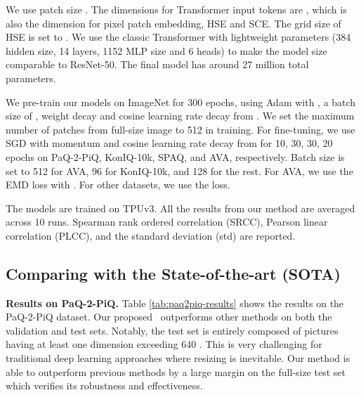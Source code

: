We use patch size . The dimensions for Transformer input tokens are , which is also the dimension for pixel patch embedding, HSE and SCE. The grid size of HSE is set to . We use the classic Transformer \cite{NIPS2017_3f5ee243} with lightweight parameters (384 hidden size, 14 layers, 1152 MLP size and 6 heads) to make the model size comparable to ResNet-50. The final model has around 27 million total parameters.

We pre-train our models on ImageNet for 300 epochs, using Adam with , a batch size of ,  weight decay and cosine learning rate decay from . We set the maximum number of patches from full-size image  to 512 in training. For fine-tuning, we use SGD with momentum and cosine learning rate decay from  for 10, 30, 30, 20 epochs on PaQ-2-PiQ, KonIQ-10k, SPAQ, and AVA, respectively. Batch size is set to 512 for AVA, 96 for KonIQ-10k, and 128 for the rest. For AVA, we use the EMD loss with . For other datasets, we use the  loss.

The models are trained on TPUv3. All the results from our method are averaged across 10 runs. Spearman rank ordered correlation (SRCC), Pearson linear correlation (PLCC), and the standard deviation (std) are reported.

\subsection{Comparing with the State-of-the-art (SOTA)}
\noindent\textbf{Results on PaQ-2-PiQ.} Table \ref{tab:paq2piq-results} shows the results on the PaQ-2-PiQ dataset. Our proposed \ours\ outperforms other methods on both the validation and test sets. Notably, the test set is entirely composed of pictures having at least one dimension exceeding 640 \cite{ying2020patches}. This is very challenging for traditional deep learning approaches where resizing is inevitable. Our method is able to outperform previous methods by a large margin on the full-size test set which verifies its robustness and effectiveness. 

